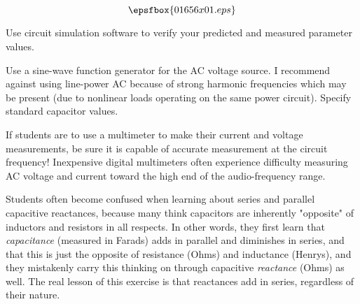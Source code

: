 

$$\epsfbox{01656x01.eps}$$

\vfil \eject






Use circuit simulation software to verify your predicted and measured parameter values.







Use a sine-wave function generator for the AC voltage source.  I recommend against using line-power AC because of strong harmonic frequencies which may be present (due to nonlinear loads operating on the same power circuit).  Specify standard capacitor values.

If students are to use a multimeter to make their current and voltage measurements, be sure it is capable of accurate measurement at the circuit frequency!  Inexpensive digital multimeters often experience difficulty measuring AC voltage and current toward the high end of the audio-frequency range.

Students often become confused when learning about series and parallel capacitive reactances, because many think capacitors are inherently "opposite" of inductors and resistors in all respects.  In other words, they first learn that {\it capacitance} (measured in Farads) adds in parallel and diminishes in series, and that this is just the opposite of resistance (Ohms) and inductance (Henrys), and they mistakenly carry this thinking on through capacitive {\it reactance} (Ohms) as well.  The real lesson of this exercise is that reactances add in series, regardless of their nature.




